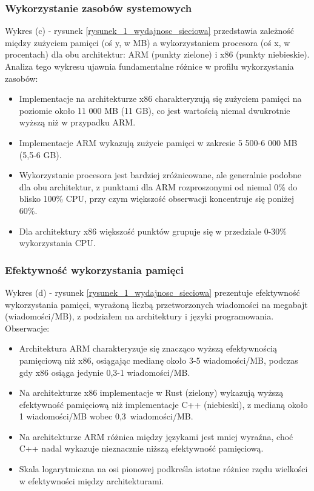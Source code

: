 \subsubsection{Wykorzystanie zasobów systemowych}
Wykres (c) - rysunek \ref{rysunek_1_wydajnosc_sieciowa} przedstawia zależność między zużyciem pamięci (oś y, w MB) a wykorzystaniem procesora (oś x, w procentach) dla obu architektur: ARM (punkty zielone) i x86 (punkty niebieskie). Analiza tego wykresu ujawnia fundamentalne różnice w profilu wykorzystania zasobów:
\begin{itemize}
    \item Implementacje na architekturze x86 charakteryzują się zużyciem pamięci na poziomie około 11 000 MB (11 GB), co jest wartością niemal dwukrotnie wyższą niż w przypadku ARM.
    \item Implementacje ARM wykazują zużycie pamięci w zakresie 5 500-6 000 MB (5,5-6 GB).
    \item Wykorzystanie procesora jest bardziej zróżnicowane, ale generalnie podobne dla obu architektur, z punktami dla ARM rozproszonymi od niemal 0\% do blisko 100\% CPU, przy czym większość obserwacji koncentruje się poniżej 60\%.
    \item Dla architektury x86 większość punktów grupuje się w przedziale 0-30\% wykorzystania CPU.
\end{itemize}

\subsubsection{Efektywność wykorzystania pamięci}
Wykres (d) - rysunek \ref{rysunek_1_wydajnosc_sieciowa} prezentuje efektywność wykorzystania pamięci, wyrażoną liczbą przetworzonych wiadomości na megabajt (wiadomości/MB), z podziałem na architektury i języki programowania. Obserwacje:
\begin{itemize}
    \item Architektura ARM charakteryzuje się znacząco wyższą efektywnością pamięciową niż x86, osiągając medianę około 3-5 wiadomości/MB, podczas gdy x86 osiąga jedynie 0,3-1 wiadomości/MB.
    \item Na architekturze x86 implementacje w Rust (zielony) wykazują wyższą efektywność pamięciową niż implementacje C++ (niebieski), z medianą około 1 wiadomości/MB wobec \mbox{0,3 wiadomości/MB}.
    \item Na architekturze ARM różnica między językami jest mniej wyraźna, choć C++ nadal wykazuje nieznacznie niższą efektywność pamięciową.
    \item Skala logarytmiczna na osi pionowej podkreśla istotne różnice rzędu wielkości w efektywności między architekturami.
\end{itemize}

